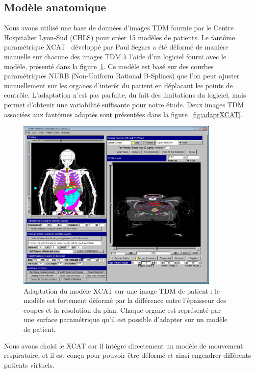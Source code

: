 \subsection{Modèle anatomique}

Nous avons utilisé une base de données d’images TDM fournie par le Centre Hospitalier Lyon-Sud (CHLS) pour créer 15 modèles de patients. Le fantôme paramétrique XCAT~\cite{segars2009mcatoverview} développé par Paul Segars a été déformé de manière manuelle sur chacune des images TDM à l’aide d’un logiciel fourni avec le modèle, présenté dans la figure~\ref{fig:fitXCAT}. Ce modèle est basé sur des courbes paramétriques NURB (Non-Uniform Rational B-Splines) que l'on peut ajuster manuellement sur les organes d'interêt du patient en déplacant les points de contrôle. L'adaptation n’est pas parfaite, du fait des limitations du logiciel, mais permet d’obtenir une variabilité suffisante pour notre étude. Deux images TDM associées aux fantômes adaptés sont présentées dans la figure~\ref{fig:adaptXCAT}.

\begin{figure}
 \centering
 \includegraphics[width=10cm]{images/FIT_XCAT}
 \caption[Adaptation du modèle XCAT sur une image TDM de patient]{Adaptation du modèle XCAT sur une image TDM de patient : le modèle est fortement déformé par la différence entre l'épaisseur des coupes et la résolution du plan. Chaque organe est représenté par une surface paramétrique qu’il est possible d’adapter sur un modèle de patient.}
 \label{fig:fitXCAT}
\end{figure}

Nous avons choisi le XCAT car il intégre directement un modèle de mouvement respiratoire, et il est conçu pour pouvoir être déformé et ainsi engendrer différents patients virtuels.

